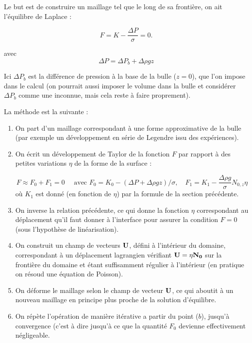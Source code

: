 Le but est de construire un maillage tel que le long de sa frontière, on ait l'équilibre de Laplace :

\begin{equation}
F = K - \frac{\Delta P}{\sigma} = 0.
\end{equation}

avec 
$$
\Delta P = \Delta P_b + \Delta \rho g z
$$




Ici $\Delta P_b$ est la différence de pression à la base de la bulle ($z=0$), que l'on impose dans le calcul
(on pourrait aussi imposer le volume dans la bulle et considérer $\Delta P_b$ comme une inconnue, mais cela reste à faire proprement).

La méthode est la suivante :



\begin{enumerate}

\item On part d'un maillage correspondant à une forme approximative de la bulle (par exemple un développement en série de Legendre issu des expériences).

\item On écrit un développement de Taylor de la fonction $F$ par rapport à des petites variations $\eta$
de la forme de la surface :

$$ 
F \approx F_0 + F_1 = 0 \quad  \mbox{ avec } 
F_0 = K_0 - (\Delta P + \Delta \rho g z)/ \sigma , 
\quad  
F_1 = K_1 - \frac{\Delta \rho g}{\sigma} N_{0,z} \eta
$$ 
où $K_1$ est donné (en fonction de $\eta$) par la formule de la section précédente.

\item On inverse la relation précédente, ce qui donne la fonction $\eta$ correspondant au déplacement
qu'il faut donner à l'interface pour assurer la condition $F=0$ (sous l'hypothèse de linéarisation).

\item On construit un champ de vecteurs $\bf U$, défini à l'intérieur du domaine, correspondant à un déplacement lagrangien vérifiant ${\bf U} = \eta {\bf N_0}$ sur la frontière du domaine et étant suffisamment régulier à l'intérieur (en pratique on résoud une équation de Poisson).

\item On déforme le maillage selon le champ de vecteur $\bf U$, ce qui aboutit à un nouveau maillage en principe plus proche de la solution d'équilibre.

\item On répète l'opération de manière itérative a partir du point ($b$), jusqu'à convergence
(c'est à dire jusqu'à ce que la quantité $F_0$ devienne effectivement négligeable.


\end{enumerate}






